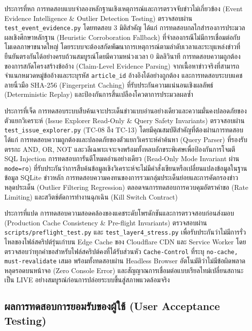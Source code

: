 ประการที่หก การทดสอบแบบจำลองหลักฐานเชิงเหตุการณ์และการตรวจจับข่าวไม่เกี่ยวข้อง (Event Evidence Intelligence \& Outlier Detection Testing) ตรวจสอบผ่าน \texttt{test\_event\_evidence.py} โดยทดสอบ 3 มิติสำคัญ ได้แก่ การทดสอบกลไกสำรองการประมวลผลเชิงศึกษาหลักฐาน (Heuristic Corroboration Fallback) ที่จำลองกรณีไม่มีการเชื่อมต่อกับโมเดลภาษาขนาดใหญ่ โดยระบบจะต้องสกัดพัฒนาการเหตุการณ์ตามลำดับเวลาและระบุแหล่งข่าวที่ยืนยันตรงกันได้อย่างครบถ้วนสมบูรณ์โดยมีความหน่วงเวลา 0 มิลลิวินาที การทดสอบความถูกต้องของการสกัดโครงสร้างข้ออ้าง (Claim-Level Evidence Parsing) จากเนื้อหาข่าวจริงที่สามารถจำแนกหมวดหมู่ข้ออ้างและระบุรหัส \texttt{article\_id} อ้างอิงได้อย่างถูกต้อง และการทดสอบระบบแคชลายนิ้วมือ SHA-256 (Fingerprint Caching) ที่รับประกันความแน่นอนเชิงผลลัพธ์ (Deterministic Replay) และป้องกันการสิ้นเปลืองโควตาการประมวลผลซ้ำ

ประการที่เจ็ด การทดสอบระบบสืบค้นเจาะประเด็นข่าวแบบอ่านอย่างเดียวและความมั่นคงปลอดภัยของตัวแยกวิเคราะห์ (Issue Explorer Read-Only \& Query Safety Invariants) ตรวจสอบผ่าน \texttt{test\_issue\_explorer.py} (TC-08 ถึง TC-13) โดยมีคุณสมบัติสำคัญที่ต้องผ่านการทดสอบ ได้แก่ การทดสอบความถูกต้องและปลอดภัยของตัวแยกวิเคราะห์คำค้นหา (Query Parser) ที่รองรับตรรกะ AND, OR, NOT และวลีเฉพาะเจาะจงพร้อมทั้งหลบอักขระพิเศษเพื่อป้องกันการโจมตี SQL Injection การทดสอบการันตีโหมดอ่านอย่างเดียว (Read-Only Mode Invariant ผ่าน \texttt{mode=ro}) ที่รับประกันว่าการสืบค้นข้อมูลเชิงวิเคราะห์จะไม่มีคำสั่งเขียนหรือเปลี่ยนแปลงข้อมูลในฐานข้อมูล SQLite ข่าวหลัก การทดสอบความคงทนของการรวมกลุ่มประเด็นย่อยและการคัดกรองข่าวหลุดประเด็น (Outlier Filtering Regression) ตลอดจนการทดสอบการควบคุมอัตราคำขอ (Rate Limiting) และสวิตช์ตัดการทำงานฉุกเฉิน (Kill Switch Contract)

ประการที่แปด การทดสอบความสอดคล้องของแคชระดับโพรดักชันและการตรวจสอบก่อนส่งมอบ (Production Cache Consistency \& Pre-flight Invariants) ตรวจสอบผ่าน \texttt{scripts/preflight\_test.py} และ \texttt{test\_layer4\_stress.py} เพื่อรับประกันว่าไม่มีการรั่วไหลของไฟล์สคริปต์รุ่นเก่าบน Edge Cache ของ Cloudflare CDN และ Service Worker โดยตรวจสอบว่าทุกคำขอสำหรับไฟล์สคริปต์คงที่ได้รับส่วนหัว \texttt{Cache-Control} ที่ระบุ \texttt{no-cache, must-revalidate} เสมอ พร้อมทั้งทดสอบผ่าน Headless Browser อัตโนมัติว่าไม่มีข้อผิดพลาดหลุดรอดบนหน้าจอ (Zero Console Error) และสัญญาณการเชื่อมต่อแบบเรียลไทม์เปลี่ยนสถานะเป็น LIVE อย่างสมบูรณ์ก่อนการปล่อยระบบขึ้นสู่สภาพแวดล้อมจริง

\subsection{ผลการทดสอบการยอมรับของผู้ใช้ (User Acceptance Testing)}


